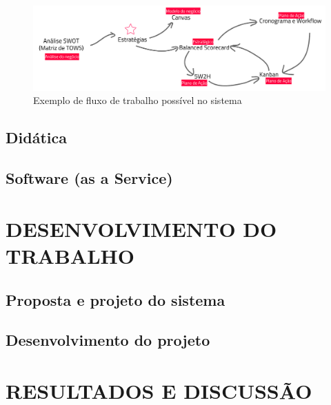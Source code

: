 \documentclass{abnt}
\begin{document}
\begin{figure}[!htb]
	\centering
	\includegraphics[width=\textwidth]{fluxograma_exemplo.pdf}
	\caption{Exemplo de fluxo de trabalho possível no sistema}
	\label{Rotulo}
\end{figure}

\section{Didática}


\section{Software (as a Service)}


\chapter{DESENVOLVIMENTO DO TRABALHO}

\section{Proposta e projeto do sistema}


\section{Desenvolvimento do projeto}


\chapter{RESULTADOS E DISCUSSÃO}
\end{document}
